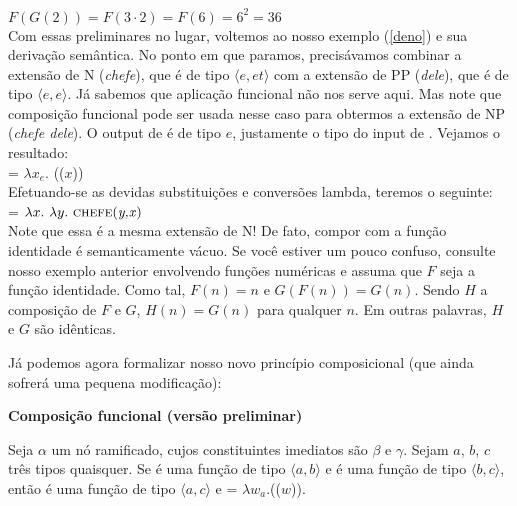 \n $F(G(2)) = F(3 \cdot 2) = F(6) = 6^{2} = 36$ \\

Com essas preliminares no lugar, voltemos ao nosso exemplo (\ref{deno}) e sua derivação semântica. No ponto em que paramos, precisávamos combinar a extensão de N (\textit{chefe}), que é de tipo $\langle e,et\rangle$ com a extensão de PP (\textit{dele}), que é de tipo $\langle e,e\rangle$. Já sabemos que aplicação funcional não nos serve aqui. Mas note que composição funcional pode ser usada nesse caso para obtermos a extensão de NP (\textit{chefe dele}). O output de  é de tipo $e$, justamente o tipo do input de . Vejamos o resultado: \\

\n {} = $\lambda x_{e}.$ (($x$))\\

\n Efetuando-se as devidas substituições e conversões lambda, teremos o seguinte:\\

\n {} = $\lambda x.\ \lambda y.\ \predica{chefe}{y,x}$ \\

\n Note que essa é a mesma extensão de N! De fato, compor com a função identidade é semanticamente vácuo. Se você estiver um pouco confuso, consulte nosso exemplo anterior envolvendo funções numéricas e assuma que $F$ seja a função identidade. Como tal, $F(n) = n$ e $G(F(n)) = G(n)$. Sendo $H$ a composição de $F$ e $G$, $H(n)=G(n)$ para qualquer $n$. Em outras palavras, $H$ e $G$ são idênticas.

Já podemos agora formalizar nosso novo princípio composicional (que ainda sofrerá uma pequena modificação):\\

\begin{tcolorbox}[boxrule=0pt,sharp corners]

\noindent \textbf{Composição funcional (versão preliminar)}

\n Seja $\alpha$ um nó ramificado, cujos constituintes imediatos
são $\beta$ e $\gamma$. Sejam $a$, $b$, $c$ três tipos  quaisquer. Se \den{$\beta$} é uma função de
tipo $\langle a,b \rangle$ e \den{$\gamma$} é uma função de
tipo $\langle b,c \rangle$, então
\den{$\alpha$} é uma função de tipo $\langle a,c \rangle$ e \den{$\alpha$} = $\lambda w_{a}.$\den{$\gamma$}(\den{$\beta$}($w$)).

\end{tcolorbox}

